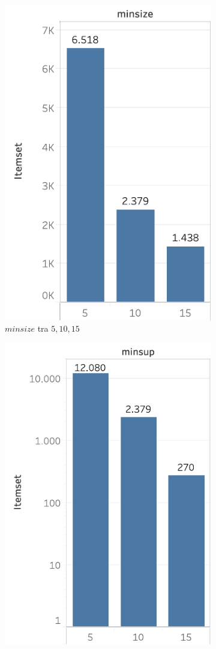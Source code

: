 \begin{figure}
  \centering
   \begin{subfigure}{.5\textwidth}
  \centering
    \includegraphics[scale=0.5]{res/fig/sec-4/itemset/ItemsetMinsize.pdf}
   \caption{\(minsize\) tra \(5,10,15\)}
  \label{fig:chap-4:ItemsetMinsize}
\end{subfigure}%
\begin{subfigure}{.5\textwidth}
  \centering
   \includegraphics[scale=0.5]{res/fig/sec-4/itemset/ItemsetMinsupp.pdf}

\end{subfigure}
\end{figure}
